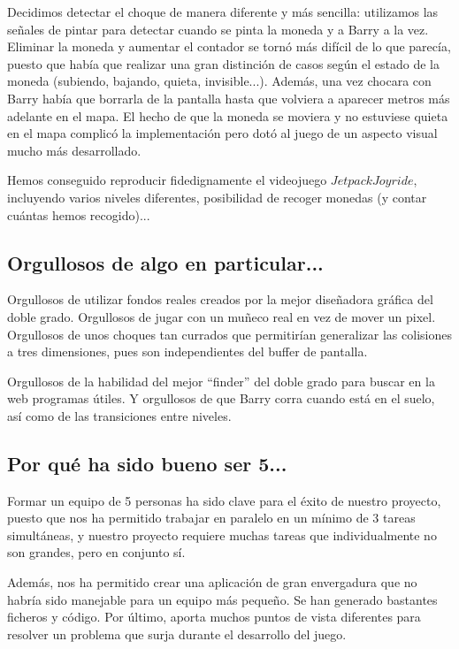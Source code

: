 \documentclass[11pt, a4paper, spanish, openright, twoside]{book}
\begin{document}
Decidimos detectar el choque de manera diferente y más sencilla: utilizamos las señales de pintar para detectar cuando se pinta la moneda y a Barry a la vez. Eliminar la moneda y aumentar el contador se tornó más difícil de lo que parecía, puesto que había que realizar una gran distinción de casos según el estado de la moneda (subiendo, bajando, quieta, invisible...). Además, una vez chocara con Barry había que borrarla de la pantalla hasta que volviera a aparecer metros más adelante en el mapa. El hecho de que la moneda se moviera y no estuviese quieta en el mapa complicó la implementación pero dotó al juego de un aspecto visual mucho más desarrollado.











Hemos conseguido reproducir fidedignamente el videojuego $Jetpack Joyride$, incluyendo varios niveles diferentes, posibilidad de recoger monedas (y contar cuántas hemos recogido)...

\subsection{Orgullosos de algo en particular...}

Orgullosos de utilizar fondos reales creados por la mejor diseñadora gráfica del doble grado. Orgullosos de jugar con un muñeco real en vez de mover un pixel. Orgullosos de unos choques tan
 currados que permitirían generalizar las colisiones a tres dimensiones, pues son independientes del buffer de pantalla. 

Orgullosos de la habilidad del mejor ``finder'' del doble grado para buscar en la web programas útiles. Y orgullosos de que Barry corra cuando está en el suelo, así como de las transiciones entre niveles.

\subsection{Por qué ha sido bueno ser 5...}
Formar un equipo de 5 personas ha sido clave para el éxito de nuestro proyecto, puesto que nos ha permitido trabajar en paralelo en un mínimo de 3 tareas simultáneas, y nuestro proyecto requiere muchas tareas que individualmente no son grandes, pero en conjunto sí. 

Además, nos ha permitido crear una aplicación de gran envergadura que no habría sido manejable para un equipo más pequeño. Se han generado bastantes ficheros y código.
Por último, aporta muchos puntos de vista diferentes para resolver un problema que surja durante el desarrollo del juego.
\end{document}
